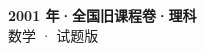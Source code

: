 \documentclass[zihao=-4, a4paper]{ctexart}
\begin{document}
\begin{center}
  {\Large\bfseries 2001 年·全国旧课程卷·理科}\\[4pt]
  {\large 数学 · 试题版}
\end{center}
\medskip
{}

\end{document}
